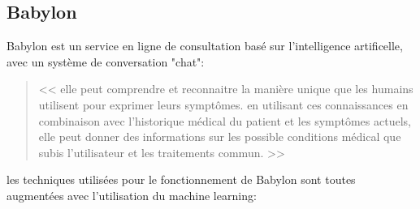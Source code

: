         \subsection*{Babylon}
            Babylon est un service en ligne de consultation basé sur l'intelligence artificelle, 
            avec un système de conversation "chat":
            \begin{quote}
                << elle peut comprendre et reconnaitre la manière 
                unique que les humains utilisent pour exprimer leurs symptômes. en utilisant ces 
                connaissances en combinaison avec l'historique médical du patient et les symptômes
                actuels, elle peut donner des informations sur les possible conditions médical 
                que subis l'utilisateur et les traitements commun. >>
            \end{quote}
            les techniques utilisées pour le fonctionnement de Babylon sont toutes 
            augmentées avec l'utilisation du machine learning: \newline
